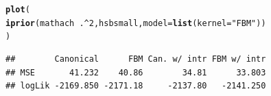 \documentclass{beamer}\usepackage[]{graphicx}\usepackage[]{color}
\makeatletter
\newcommand{\hlnum}[1]{\textcolor[rgb]{0.686,0.059,0.569}{#1}}%
\newcommand{\hlstr}[1]{\textcolor[rgb]{0.192,0.494,0.8}{#1}}%
\newcommand{\hlopt}[1]{\textcolor[rgb]{0,0,0}{#1}}%
\newcommand{\hlstd}[1]{\textcolor[rgb]{0.345,0.345,0.345}{#1}}%
\newcommand{\hlkwc}[1]{\textcolor[rgb]{0.333,0.667,0.333}{#1}}%
\newcommand{\hlkwd}[1]{\textcolor[rgb]{0.737,0.353,0.396}{\textbf{#1}}}%
\newenvironment{kframe}{%
 \def\at@end@of@kframe{}%
 \ifinner\ifhmode%
  \def\at@end@of@kframe{\end{minipage}}%
  \begin{minipage}{\columnwidth}%
 \fi\fi%
 \def\FrameCommand##1{\hskip\@totalleftmargin \hskip-\fboxsep
 \colorbox{shadecolor}{##1}\hskip-\fboxsep
     \hskip-\linewidth \hskip-\@totalleftmargin \hskip\columnwidth}%
 \MakeFramed {\advance\hsize-\width
   \@totalleftmargin\z@ \linewidth\hsize
   \@setminipage}}%
 {\par\unskip\endMakeFramed%
 \at@end@of@kframe}
\newenvironment{knitrout}{}{} %
\makeatother
\begin{document}
\newsavebox{\ipriordemog}
\begin{lrbox}{\ipriordemog}
\begin{knitrout}\small
{}\color{fgcolor}\begin{kframe}
\begin{alltt}
\hlkwd{plot}\hlstd{(}
  \hlkwd{iprior}\hlstd{(mathach} \hlopt{~} \hlstd{.} \hlopt{^} \hlnum{2}\hlstd{, hsbsmall,} \hlkwc{model} \hlstd{=} \hlkwd{list}\hlstd{(}\hlkwc{kernel} \hlstd{=} \hlstr{"FBM"}\hlstd{))}
\hlstd{)}
\end{alltt}
\end{kframe}
\end{knitrout}
\end{lrbox}



\newsavebox{\ipriordemoh}
\begin{lrbox}{\ipriordemoh}
\begin{knitrout}\small
{}\color{fgcolor}\begin{kframe}
\begin{verbatim}
##        Canonical      FBM Can. w/ intr FBM w/ intr
## MSE       41.232    40.86        34.81      33.803
## logLik -2169.850 -2171.18     -2137.80   -2141.250
\end{verbatim}
\end{kframe}
\end{knitrout}
\end{lrbox}
\end{document}
